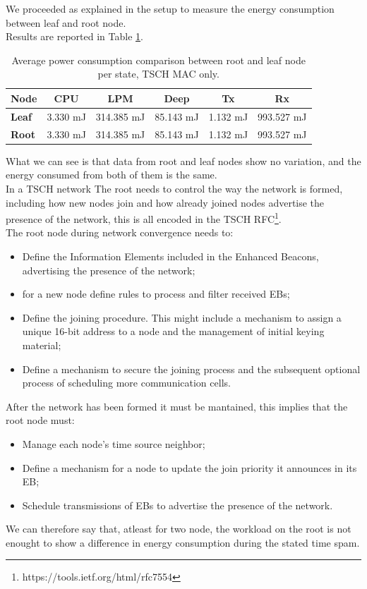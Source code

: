 \documentclass[conference]{IEEEtran}
\begin{document}
We proceeded as explained in the setup to measure the energy consumption between leaf and root node.\\
Results are reported in Table \ref{tab:MACOnly}.
\begin{table}[h]
	\centering
	\begin{tabular}{llllll}
		\hline
		\textbf{Node} & \multicolumn{1}{c}{\textbf{CPU}} & \multicolumn{1}{c}{\textbf{LPM}} & \multicolumn{1}{c}{\textbf{Deep}} & \multicolumn{1}{c}{\textbf{Tx}} & \multicolumn{1}{c}{\textbf{Rx}} \\ \hline
		\textbf{Leaf} & 3.330 mJ                         & 314.385 mJ                       & 85.143 mJ                         & 1.132 mJ                        & 993.527 mJ                      \\
		\textbf{Root} & 3.330 mJ                         & 314.385 mJ                       & 85.143 mJ                         & 1.132 mJ                        & 993.527 mJ                      \\ \hline
	\end{tabular}
	\caption{Average power consumption comparison between root and leaf node per state, TSCH MAC only.}
	\label{tab:MACOnly}
\end{table}
What we can see is that data from root and leaf nodes show no variation, and the energy consumed from both of them is the same.\\
In a TSCH network The root needs to control the way the network is formed, including how new nodes join and how already joined nodes advertise the presence of the network, this is all encoded in the TSCH RFC\footnote{https://tools.ietf.org/html/rfc7554}.\\
The root node during network convergence needs to:
\begin{itemize}
	\item Define the Information Elements included in the Enhanced Beacons, advertising the presence of the network;
	\item for a new node define rules to process and filter received EBs;
	\item Define the joining procedure.  This might include a mechanism to assign a unique 16-bit address to a node and the management of initial keying material;
	\item Define a mechanism to secure the joining process and the subsequent optional process of scheduling more communication cells.
\end{itemize}
After the network has been formed it must be mantained, this implies that the root node must:
\begin{itemize}
	\item Manage each node's time source neighbor;
	\item Define a mechanism for a node to update the join priority it announces in its EB;
	\item Schedule transmissions of EBs to advertise the presence of the network.
\end{itemize}
We can therefore say that, atleast for two node, the workload on the root is not enought to show a difference in energy consumption during the stated time spam.
\end{document}
